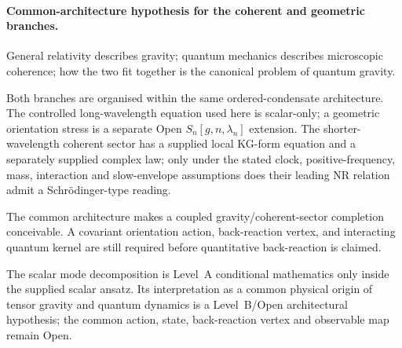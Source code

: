 \documentclass[11pt,a4paper]{article}
\begin{document}
\paragraph{Common-architecture hypothesis for the coherent and geometric branches.}
\begin{description}[leftmargin=2.8cm, style=nextline]
\item[Standard physics.] General relativity describes gravity; quantum mechanics describes microscopic coherence; how the two fit together is the canonical problem of quantum gravity.
\item[ECT (physical picture).] Both branches are organised within the same ordered-condensate architecture.  The controlled long-wavelength equation used here is scalar-only; a geometric orientation stress is a separate Open $S_n[g,n,\lambda_n]$ extension.  The shorter-wavelength coherent sector has a supplied local KG-form equation and a separately supplied complex law; only under the stated clock, positive-frequency, mass, interaction and slow-envelope assumptions does their leading NR relation admit a Schr\"odinger-type reading.
\item[What this suggests.] The common architecture makes a coupled gravity/coherent-sector completion conceivable.  A covariant orientation action, back-reaction vertex, and interacting quantum kernel are still required before quantitative back-reaction is claimed.
\item[Status.] The scalar mode decomposition is Level~A conditional
mathematics only inside the supplied scalar ansatz.  Its interpretation as
a common physical origin of tensor gravity and quantum dynamics is a
Level~B/Open architectural hypothesis; the common action, state,
back-reaction vertex and observable map remain Open.
\end{description}
\end{document}
